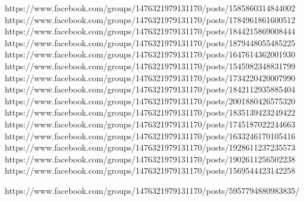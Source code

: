  
 
 
 
 


https://www.facebook.com/groups/1476321979131170/posts/1585860314844002
https://www.facebook.com/groups/1476321979131170/posts/1784961861600512
https://www.facebook.com/groups/1476321979131170/posts/1844215869008444
https://www.facebook.com/groups/1476321979131170/posts/1879448055485225
https://www.facebook.com/groups/1476321979131170/posts/1647614362001930
https://www.facebook.com/groups/1476321979131170/posts/1545982348831799
https://www.facebook.com/groups/1476321979131170/posts/1734220420007990
https://www.facebook.com/groups/1476321979131170/posts/1842112935885404
https://www.facebook.com/groups/1476321979131170/posts/2001880426575320
https://www.facebook.com/groups/1476321979131170/posts/1835139423249422
https://www.facebook.com/groups/1476321979131170/posts/1745187022244663
https://www.facebook.com/groups/1476321979131170/posts/1633246170105416
https://www.facebook.com/groups/1476321979131170/posts/1928611237235573
https://www.facebook.com/groups/1476321979131170/posts/1902611256502238
https://www.facebook.com/groups/1476321979131170/posts/1569544423142258

https://www.facebook.com/groups/1476321979131170/posts/5957794880983835/
